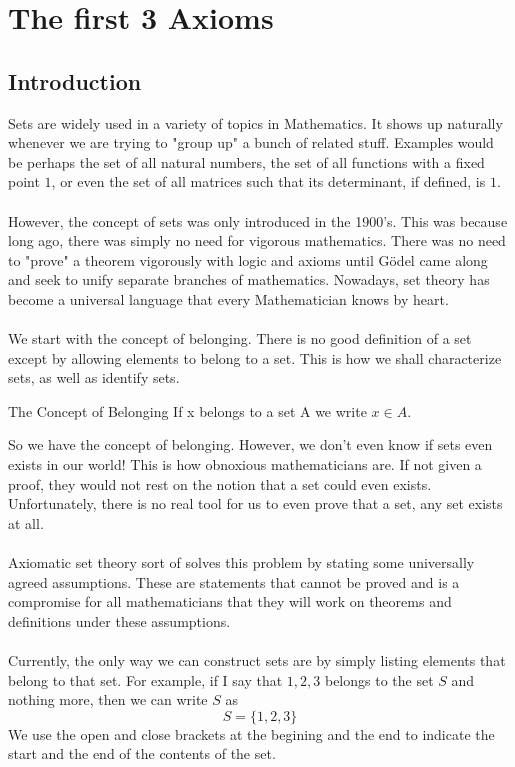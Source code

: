 \section{The first 3 Axioms}
\subsection{Introduction}
Sets are widely used in a variety of topics in Mathematics. It shows up naturally whenever we are trying to "group up" a bunch of related stuff. Examples would be perhaps the set of all natural numbers, the set of all functions with a fixed point $1$, or even the set of all matrices such that its determinant, if defined, is $1$. \\~\\
However, the concept of sets was only introduced in the 1900's. This was because long ago, there was simply no need for vigorous mathematics. There was no need to "prove" a theorem vigorously with logic and axioms until Gödel came along and seek to unify separate branches of mathematics. Nowadays, set theory has become a universal language that every Mathematician knows by heart. \\~\\
We start with the concept of belonging. There is no good definition of a set except by allowing elements to belong to a set. This is how we shall characterize sets, as well as identify sets. 
\begin{defn}{The Concept of Belonging}{} If x belongs to a set A we write $x\in A$. 
\end{defn}

So we have the concept of belonging. However, we don't even know if sets even exists in our world! This is how obnoxious mathematicians are. If not given a proof, they would not rest on the notion that a set could even exists. Unfortunately, there is no real tool for us to even prove that a set, any set exists at all. \\~\\
Axiomatic set theory sort of solves this problem by stating some universally agreed assumptions. These are statements that cannot be proved and is a compromise for all mathematicians that they will work on theorems and definitions under these assumptions. \\~\\

Currently, the only way we can construct sets are by simply listing elements that belong to that set. For example, if I say that $1,2,3$ belongs to the set $S$ and nothing more, then we can write $S$ as $$S=\{1,2,3\}$$ We use the open and close brackets at the begining and the end to indicate the start and the end of the contents of the set. 

